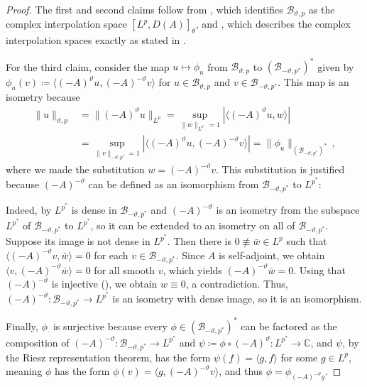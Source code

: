 \documentclass[final]{amsart}
\numberwithin{thm}{section}
\numberwithin{equation}{section}
\newcommand{\ip}[2]{\langle #1, #2 \rangle}
\newcommand{\B}{\mathcal{B}}
\begin{document}
\begin{proof}
    The first and second claims follow from \cite[Theorem 3 and Corollary after Theorem 4]{complex-interp-equals-domain-of-frac-powers}, which identifies $\B_{\vartheta,p}$ as the complex interpolation space $[L^p, D(A)]_\theta$, and \cite[Theorem 4.1]{interpolation-with-bc}, which describes the complex interpolation spaces exactly as stated in .

    

    For the third claim, consider the map $u \mapsto \phi_u$ from $\B_{\vartheta,p}$ to $(\B_{-\vartheta,p^*})^*$ given by $\phi_u(v) \coloneqq \ip{(-A)^\vartheta u}{(-A)^{-\vartheta}v}$ for $u \in \B_{\vartheta,p}$ and $v \in \B_{-\vartheta,p^*}$. This map is an isometry because
    \begin{align*}
        \|u\|_{\vartheta,p} &= \|(-A)^\vartheta u\|_{L^p} = \sup_{\|w\|_{L^{p^*}} = 1} |\ip{(-A)^\vartheta u}{w}| \\
        &= \sup_{\|v\|_{-\vartheta,p^*} = 1} |\ip{(-A)^\vartheta u}{(-A)^{-\vartheta}v}| = \|\phi_u\|_{(\B_{-\vartheta,p^*})^*} \,,
    \end{align*}
     where we made the substitution $w = (-A)^{-\vartheta}v$. This substitution is justified because $(-A)^{-\vartheta}$ can be defined as an isomorphism from $\B_{-\vartheta,p^*}$ to $L^{p^*}$:
     
     Indeed, by  $L^{p^*}$ is dense in $\B_{-\vartheta,p^*}$ and $(-A)^{-\vartheta}$ is an isometry from the subspace $L^{p^*}$ of $\B_{-\vartheta,p^*}$ to $L^{p^*}$, so it can be extended to an isometry on all of $\B_{-\vartheta,p^*}$. Suppose its image is not dense in $L^{p^*}$. Then there is $0 \not \equiv \bar{w} \in L^{p}$ such that $\langle (-A)^{-\vartheta}v, \bar{w}\rangle = 0$ for each $v \in \B_{-\vartheta,p^*}$. Since $A$ is self-adjoint, we obtain $
     \langle v, (-A)^{-\vartheta}\bar{w}\rangle = 0$ for all smooth $v$, which yields $(-A)^{-\vartheta}\bar{w} = 0$.  Using that $(-A)^{-\vartheta}$ is injective (), we obtain $w \equiv 0$, a contradiction. Thus, $(-A)^{-\vartheta}: \B_{-\vartheta,p^*} \to L^{p^*}$ is an isometry with dense image, so it is an isomorphism.

     
     
     
     

    Finally, $\phi_\cdot$ is surjective because every $\phi \in (\B_{-\vartheta,p^*})^*$ can be factored as the composition of $(-A)^{-\vartheta}: \B_{-\vartheta,p^*} \to L^{p^*}$ and $\psi \coloneqq \phi \circ (-A)^{\vartheta}: L^{p^*} \to \mathbb{C}$, and $\psi$, by the Riesz representation theorem, has the form $\psi(f) = \ip{g}{f}$ for some $g \in L^p$, meaning $\phi$ has the form $\phi(v) = \ip{g}{(-A)^{-\vartheta}v}$, and thus $\phi = \phi_{(-A)^{-\vartheta}g}$.
\end{proof}
\end{document}
